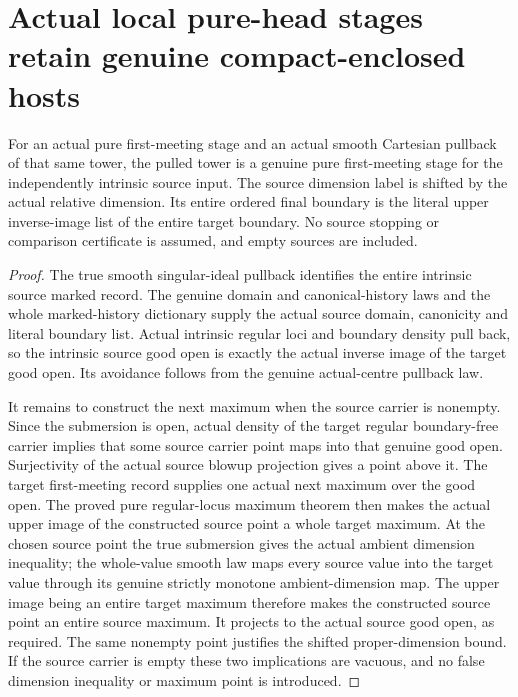 \section{Actual local pure-head stages retain genuine compact-enclosed hosts}
\label{sec:hironaka-original-local-pure-head-hosts}

\begin{theorem}
\label{hir:original-local-pure-head-whole-smooth-transport}
For an actual pure first-meeting stage and an actual smooth Cartesian
pullback of that same tower, the pulled tower is a genuine pure
first-meeting stage for the independently intrinsic source input.
The source dimension label is shifted by the actual relative dimension.
Its entire ordered final boundary is the literal upper inverse-image
list of the entire target boundary. No source stopping or comparison
certificate is assumed, and empty sources are included.
\leanok
\end{theorem}
\begin{proof}
The true smooth singular-ideal pullback identifies the entire intrinsic
source marked record. The genuine domain and canonical-history laws
and the whole marked-history dictionary supply the actual source
domain, canonicity and literal boundary list. Actual intrinsic regular
loci and boundary density pull back, so the intrinsic source good open
is exactly the actual inverse image of the target good open. Its
avoidance follows from the genuine actual-centre pullback law.

It remains to construct the next maximum when the source carrier is
nonempty. Since the submersion is open, actual density of the target
regular boundary-free carrier implies that some source carrier point
maps into that genuine good open. Surjectivity of the actual source
blowup projection gives a point above it. The target first-meeting
record supplies one actual next maximum over the good open. The
proved pure regular-locus maximum theorem then makes the actual upper
image of the constructed source point a whole target maximum. At the
chosen source point the true submersion gives the actual ambient
dimension inequality; the whole-value smooth law maps every source
value into the target value through its genuine strictly monotone
ambient-dimension map. The upper image being an entire target maximum
therefore makes the constructed source point an entire source maximum.
It projects to the actual source good open, as required. The same
nonempty point justifies the shifted proper-dimension bound. If the
source carrier is empty these two implications are vacuous, and no
false dimension inequality or maximum point is introduced.
\end{proof}

